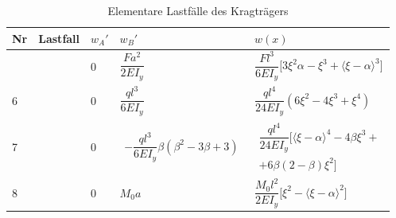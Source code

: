 \begin{table}
	\begin{tabular}{>{\centering\arraybackslash}m{0.5cm} >{\centering\arraybackslash}m{5cm} >{\centering\arraybackslash}m{3cm}>{\centering\arraybackslash}m{6cm} >{\centering\arraybackslash}m{6cm}}
		\toprule
		Nr & Lastfall & $w_A'$ & $w_B'$ & $w(x)$\\\midrule
		5
		&  & 
		$0$ & 
		$\dfrac{Fa^2}{2EI_y}$ & 
		$\dfrac{Fl^3}{6EI_y}\Big[3\xi^2\alpha-\xi^3
		+\big\langle \xi -\alpha\big\rangle^3\Big]$
		\\\midrule
		6 &  & 
		$0$ & 
		$\dfrac{ql^3}{6EI_y}$ & 
		$\dfrac{ql^4}{24EI_y}\left(6\xi^2-4\xi^3+\xi^4\right)$
		\\\midrule
		7 &  & 
		$0$ &
		\begin{minipage}{5cm}
			\begin{multline}
			-\dfrac{ql^3}{6EI_y}\beta(\beta^2-3\beta+3)
			\end{multline}
		\end{minipage}
		& 
		\begin{minipage}{5cm}
			\begin{multline}
			\dfrac{ql^4}{24EI_y}\Big[\big\langle\xi-\alpha\big\rangle^4-4\beta\xi^3+ \\ 
			+6\beta(2-\beta)\xi^2\Big]
			\end{multline}
		\end{minipage}
		\\\midrule
		8 &  & 
		$0$ & 
		$M_0a$ & 
		$\dfrac{M_0l^2}{2EI_y}\Big[\xi^2-\big\langle\xi-\alpha\big\rangle^2\Big]$
		\\\bottomrule
	\end{tabular}
	\caption{Elementare Lastfälle des Kragträgers}
	\label{tab:2-2}
\end{table}

